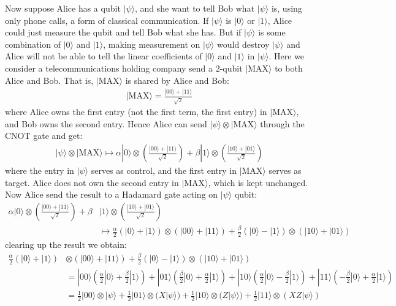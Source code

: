 \documentclass[11pt]{book}
\theoremstyle{break}
\theoremstyle{break}
\begin{document}
Now suppose Alice has a qubit $|\psi\rangle$, and she want to tell Bob what $|\psi\rangle$ is, using only phone calls, a form of classical communication. If $|\psi\rangle$ is $|0\rangle$ or $|1\rangle$, Alice could just measure the qubit and tell Bob what she has. But if $|\psi\rangle$ is some combination of $|0\rangle$ and $|1\rangle$, making measurement on $|\psi\rangle$ would destroy $|\psi\rangle$ and Alice will not be able to tell the linear coefficients of $|0\rangle$ and $|1\rangle$ in $|\psi\rangle$. Here we consider a telecommunications holding company send a $2$-qubit $|\text{MAX}\rangle$ to both Alice and Bob. That is, $|\text{MAX}\rangle$ is shared by Alice and Bob:
\begin{align*}
|\text{MAX}\rangle = \frac{|00\rangle+ |11\rangle}{\sqrt{2}}
\end{align*}
where Alice owns the first entry (not the first term, the first entry) in  $|\text{MAX}\rangle$, and Bob owns the second entry. Hence Alice can send $|\psi\rangle \otimes |\text{MAX}\rangle$ through the CNOT gate and get:
\begin{align*}
|\psi\rangle \otimes |\text{MAX}\rangle \mapsto \alpha |0\rangle \otimes \left(\frac{|00\rangle + |11\rangle}{\sqrt{2}} \right) + \beta |1\rangle \otimes \left(\frac{|10\rangle + |01\rangle}{\sqrt{2}} \right)
\end{align*}
where the entry in $|\psi\rangle$ serves as control, and the first entry in $|\text{MAX}\rangle$ serves as target. Alice does not own the second entry in $|\text{MAX}\rangle$, which is kept unchanged. Now Alice send the result to a Hadamard gate acting on $|\psi\rangle$ qubit:
\begin{align*}
\alpha |0\rangle \otimes \left(\frac{|00\rangle + |11\rangle}{\sqrt{2}} \right) + \beta &|1\rangle \otimes \left(\frac{|10\rangle + |01\rangle}{\sqrt{2}} \right) \\
&\mapsto 
 \frac{\alpha}{2}\left( |0\rangle + |1\rangle \right) \otimes \left( |00\rangle + |11\rangle \right)  + \frac{\beta}{2}\left( |0\rangle - |1\rangle \right)\otimes \left( |10\rangle + |01\rangle\right)
\end{align*}
clearing up the result we obtain:
\begin{align*}
 \frac{\alpha}{2}\left( |0\rangle + |1\rangle \right) &\otimes \left( |00\rangle + |11\rangle \right)  + \frac{\beta}{2}\left( |0\rangle - |1\rangle \right)\otimes \left( |10\rangle + |01\rangle\right) \\
&= |00\rangle \left( \frac{\alpha}{2}|0\rangle + \frac{\beta}{2}|1\rangle \right) +|01\rangle \left( \frac{\beta}{2}|0\rangle + \frac{\alpha}{2}|1\rangle \right) + |10 \rangle \left( \frac{\alpha}{2}|0\rangle - \frac{\beta}{2}|1\rangle \right) + |11\rangle  \left( -\frac{\beta}{2}|0\rangle + \frac{\alpha}{2}|1\rangle\right) 
 \\
&= \frac{1}{2}|00\rangle \otimes |\psi\rangle + \frac{1}{2}|01\rangle \otimes(X|\psi\rangle ) + \frac{1}{2}|10\rangle \otimes (Z|\psi\rangle) + \frac{1}{2}|11\rangle \otimes (XZ|\psi\rangle) \tag{*}
\end{align*}
\end{document}

